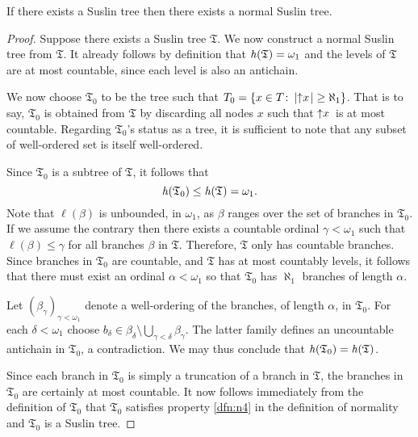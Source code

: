 \begin{lem}\label{lem:norm}
	If there exists a Suslin tree then there exists a normal Suslin tree.
\end{lem}
\begin{proof}
	Suppose there exists a Suslin tree $\mathfrak{T}$.  We now construct a
	normal Suslin tree from $\mathfrak{T}$.  It already follows by definition that
	$\mathit{h}(\mathfrak{T})=\omega_1$ and the levels of $\mathfrak{T}$ are at most
	countable, since each level is also an antichain.

	We now choose $\mathfrak{T}_0$ to be the tree such that
	$T_0=\left\lbrace x\in T\colon \left\lvert\left\uparrow x\right.\right\rvert\geq\aleph_1 \right\rbrace$.  That is to say,
	$\mathfrak{T}_0$ is obtained from $\mathfrak{T}$ by discarding all nodes $x$
	such that $\left\uparrow x\right.$ is at most countable.  Regarding $\mathfrak{T}_{0}$'s
	status as a tree, it is sufficient to note that any subset of well-ordered
	set is itself well-ordered.

	Since $\mathfrak{T}_{0}$ is a subtree of $\mathfrak{T}$, it follows that
	\begin{equation}
		\mathit{h}(\mathfrak{T}_{0})\leq\mathit{h}(\mathfrak{T})=\omega_{1}.
	\end{equation}
	Note that $\ell(\beta)$ is unbounded, in $\omega_{1}$, as $\beta$ ranges
	over the set of branches in $\mathfrak{T}_{0}$.  If we assume the contrary
	then there exists a countable ordinal $\gamma<\omega_{1}$ such that
	$\ell(\beta)\leq\gamma$ for all branches $\beta$ in $\mathfrak{T}$.  Therefore, $\mathfrak{T}$ only has countable branches.  Since
	branches in $\mathfrak{T}_{0}$ are countable, and $\mathfrak{T}$ has at most
	countably levels, it follows that there must exist an ordinal
	$\alpha<\omega_{1}$ so that $\mathfrak{T}_{0}$ has $\aleph_{1}$ branches of
	length $\alpha$.

	Let $(\beta_{\gamma})_{\gamma<\omega_{1}}$ denote a well-ordering of the
	branches, of length $\alpha$, in $\mathfrak{T}_{0}$.  For each
	$\delta<\omega_{1}$ choose
	$b_{\delta}\in \beta_{\delta}\setminus\bigcup_{\gamma<\delta}\beta_{\gamma}$.
	The latter family defines an uncountable antichain in $\mathfrak{T}_{0}$, a
	contradiction.  We may thus conclude that
	$\mathit{h}(\mathfrak{T}_{0})=\mathit{h}(\mathfrak{T})$.

	Since each branch in $\mathfrak{T}_{0}$ is simply a truncation of a branch
	in $\mathfrak{T}$, the branches in $\mathfrak{T}_{0}$ are certainly at most
	countable.  It now follows immediately from the definition of $\mathfrak{T}_0$
	that $\mathfrak{T}_0$ satisfies property \ref{dfn:n4} in the definition of
	normality and $\mathfrak{T}_{0}$ is a Suslin tree.


\end{proof}
